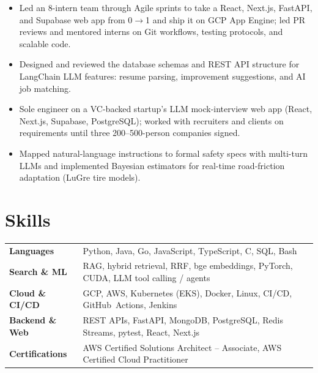 \documentclass[11pt, letterpaper]{article}
\begin{document}
\begin{itemize}
  \item Led an 8-intern team through Agile sprints to take a React, Next.js, FastAPI, and Supabase web app from 0$\to$1 and ship it on GCP App Engine; led PR reviews and mentored interns on Git workflows, testing protocols, and scalable code.
  \item Designed and reviewed the database schemas and REST API structure for LangChain LLM features: resume parsing, improvement suggestions, and AI job matching.
\end{itemize}

\begin{itemize}
  \item Sole engineer on a VC-backed startup's LLM mock-interview web app (React, Next.js, Supabase, PostgreSQL); worked with recruiters and clients on requirements until three 200--500-person companies signed.
\end{itemize}

\begin{itemize}
  \item Mapped natural-language instructions to formal safety specs with multi-turn LLMs and implemented Bayesian estimators for real-time road-friction adaptation (LuGre tire models).
\end{itemize}

\section{Skills}
\begin{tabularx}{\textwidth}{@{}l @{\hspace{7pt}} >{\raggedright\arraybackslash}X@{}}
  \textbf{Languages} & Python, Java, Go, JavaScript, TypeScript, C, SQL, Bash \\[1pt]
  \textbf{Search \& ML} & RAG, hybrid retrieval, RRF, bge embeddings, PyTorch, CUDA, LLM tool calling / agents \\[1pt]
  \textbf{Cloud \& CI/CD} & GCP, AWS, Kubernetes (EKS), Docker, Linux, CI/CD, GitHub~Actions, Jenkins \\[1pt]
  \textbf{Backend \& Web} & REST APIs, FastAPI, MongoDB, PostgreSQL, Redis Streams, pytest, React, Next.js \\[1pt]
  \textbf{Certifications} & AWS Certified Solutions Architect -- Associate, AWS Certified Cloud Practitioner \\
\end{tabularx}
\end{document}
